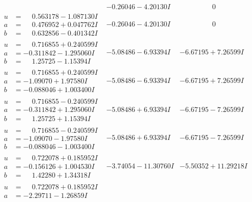 \documentclass[1p]{elsarticle_modified}
\theoremstyle{definition}
\begin{document}
$$\begin{array}{c|c|c}
 & -0.26046 - 4.20130 I & \phantom{-0.000000 } 0 \\ \hline\begin{aligned}
u &= \phantom{-}0.563178 - 1.087130 I \\
a &= \phantom{-}0.476952 + 0.047762 I \\
b &= \phantom{-}0.632856 - 0.401342 I\end{aligned}
 & -0.26046 - 4.20130 I & \phantom{-0.000000 } 0 \\ \hline\begin{aligned}
u &= \phantom{-}0.716855 + 0.240599 I \\
a &= -0.311842 - 1.295060 I \\
b &= \phantom{-}1.25725 - 1.15394 I\end{aligned}
 & -5.08486 - 6.93394 I & -6.67195 + 7.26599 I \\ \hline\begin{aligned}
u &= \phantom{-}0.716855 + 0.240599 I \\
a &= -1.09070 + 1.97580 I \\
b &= -0.088046 + 1.003400 I\end{aligned}
 & -5.08486 - 6.93394 I & -6.67195 + 7.26599 I \\ \hline\begin{aligned}
u &= \phantom{-}0.716855 - 0.240599 I \\
a &= -0.311842 + 1.295060 I \\
b &= \phantom{-}1.25725 + 1.15394 I\end{aligned}
 & -5.08486 + 6.93394 I & -6.67195 - 7.26599 I \\ \hline\begin{aligned}
u &= \phantom{-}0.716855 - 0.240599 I \\
a &= -1.09070 - 1.97580 I \\
b &= -0.088046 - 1.003400 I\end{aligned}
 & -5.08486 + 6.93394 I & -6.67195 - 7.26599 I \\ \hline\begin{aligned}
u &= \phantom{-}0.722078 + 0.185952 I \\
a &= -0.156126 + 1.004530 I \\
b &= \phantom{-}1.42280 + 1.34318 I\end{aligned}
 & -3.74054 - 11.30760 I & -5.50352 + 11.29218 I \\ \hline\begin{aligned}
u &= \phantom{-}0.722078 + 0.185952 I \\
a &= -2.29711 - 1.26859 I \\

\end{aligned}
\end{array}$$
\end{document}
